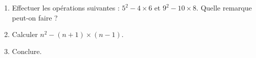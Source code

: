 
\begin{enumerate}
\item Effectuer les opérations suivantes : $5^2-4\times 6$ \quad et \quad $9^2-10 \times 8$. Quelle remarque peut-on faire ?
\item Calculer $n^2-(n+1) \times (n-1)$.
\item Conclure.
\end{enumerate}
